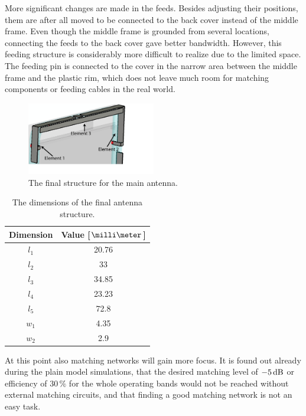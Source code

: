 More significant changes are made in the feeds. Besides adjusting their positions, them are after all moved to be connected to the back cover instead of the middle frame. Even though the middle frame is grounded from several locations, connecting the feeds to the back cover gave better bandwidth. However, this feeding structure is considerably more difficult to realize due to the limited space. The feeding pin is connected to the cover in the narrow area between the middle frame and the plastic rim, which does not leave much room for matching components or feeding cables in the real world.

\begin{figure}[H]
    \centering
    \includegraphics[width=0.5\textwidth]{img/main_final.eps}
    \caption{The final structure for the main antenna.}
    \label{fig:main_final}
\end{figure}
\begin{table}[H]
    \centering
    \caption{The dimensions of the final antenna structure.}
    \label{tab:main_final}
    \begin{tabular}{|c|c|}
        \hline
        \textbf{Dimension} & \textbf{Value [$\milli\meter$]}\\
        \hline
        $l_1$ & 20.76 \\
        \hline
        $l_2$ & 33\\
        \hline
        $l_3$ & 34.85 \\
        \hline
        $l_4$ & 23.23 \\
        \hline
        $l_5$ & 72.8 \\
        \hline
        $w_1$ & 4.35\\
        \hline
        $w_2$ & 2.9\\
        \hline
    \end{tabular}
\end{table}


At this point also matching networks will gain more focus. It is found out already during the plain model simulations, that the desired matching level of $-5\,\mathrm{dB}$ or efficiency of $30\,\%$ for the whole operating bands would not be reached without external matching circuits, and that finding a good matching network is not an easy task.

